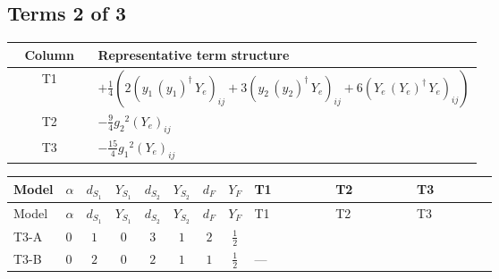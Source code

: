 \documentclass[8pt]{article}
\begin{document}
\begin{landscape}
\subsection*{Terms 2 of 3}
\begin{center}
\begin{tabular}{@{}c >{\raggedright\arraybackslash}p{0.82\linewidth}@{}}
\toprule
Column & Representative term structure \\
\midrule
T1 & \(\displaystyle +\frac{1}{4} (2 \left({y_1}\,\left({y_1}\right)^{\dagger}\,{Y_e}\right)_{ij}+3 \left({y_2}\,\left({y_2}\right)^{\dagger}\,{Y_e}\right)_{ij}+6 \left({Y_e}\,\left({Y_e}\right)^{\dagger}\,{Y_e}\right)_{ij})\) \\
\midrule
T2 & \(\displaystyle -\frac{9}{4} {g_2}^2 \left({Y_e}\right)_{ij}\) \\
\midrule
T3 & \(\displaystyle -\frac{15}{4} {g_1}^2 \left({Y_e}\right)_{ij}\) \\
\midrule
\bottomrule
\end{tabular}
\end{center}
\smallskip
\tiny
\begin{longtable}{@{}llcccccc >{\raggedright\arraybackslash}p{0.21\linewidth} >{\raggedright\arraybackslash}p{0.21\linewidth} >{\raggedright\arraybackslash}p{0.21\linewidth}@{}}
\toprule
Model & $\alpha$ & $d_{S_1}$ & $Y_{S_1}$ & $d_{S_2}$ & $Y_{S_2}$ & $d_F$ & $Y_F$ & T1 & T2 & T3 \\
\midrule
\endfirsthead
\toprule
Model & $\alpha$ & $d_{S_1}$ & $Y_{S_1}$ & $d_{S_2}$ & $Y_{S_2}$ & $d_F$ & $Y_F$ & T1 & T2 & T3 \\
\midrule
\endhead
T3-A & $0$ & $1$ & $0$ & $3$ & $1$ & $2$ & $\frac{1}{2}$ & \scriptsize\adjustbox{max width=\linewidth}{$\begin{gathered} +\frac{1}{4} (2 \left({y_1}\,\left({y_1}\right)^{\dagger}\,{Y_e}\right)_{ij}+3 \left({y_2}\,\left({y_2}\right)^{\dagger}\,{Y_e}\right)_{ij}+6 \left({Y_e}\,\left({Y_e}\right)^{\dagger}\,{Y_e}\right)_{ij})\end{gathered}$} & \scriptsize\adjustbox{max width=\linewidth}{$\begin{gathered} -\frac{9}{4} {g_2}^2 \left({Y_e}\right)_{ij}\end{gathered}$} & \scriptsize\adjustbox{max width=\linewidth}{$\begin{gathered} -\frac{15}{4} {g_1}^2 \left({Y_e}\right)_{ij}\end{gathered}$} \\
\midrule
T3-B & $0$ & $2$ & $0$ & $2$ & $1$ & $1$ & $\frac{1}{2}$ & --- & \scriptsize\adjustbox{max width=\linewidth}{$\begin{gathered} -\frac{9}{4} {g_2}^2 \left({Y_e}\right)_{ij}\end{gathered}$} & \scriptsize\adjustbox{max width=\linewidth}{$\begin{gathered} -\frac{15}{4} {g_1}^2 \left({Y_e}\right)_{ij}\end{gathered}$} \\

\end{longtable}
\end{landscape}
\end{document}
